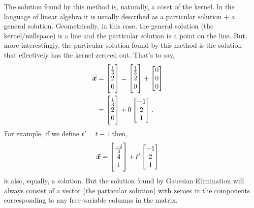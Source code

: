 \documentclass[../MathsNotesBase.tex]{subfiles}
\begin{document}
{		
		
		\bigskip
		The solution found by this method is, naturally, a coset of the kernel. In the language of linear algebra it is usually described as a particular solution + a general solution. Geometrically, in this case, the general solution (the kernel/nullspace) is a line and the particular solution is a point on the line. But, more interestingly, the particular solution found by this method is the solution that effectively has the kernel zero-ed out. That's to say,
		\begin{align*}
		\vec{\bm{x}} &= \begin{bmatrix}\frac{1}{3}\\2\\0\end{bmatrix} = \begin{bmatrix}\frac{1}{3}\\2\\0\end{bmatrix} + \begin{bmatrix}0\\0\\0\end{bmatrix} \\
		&= \begin{bmatrix}\frac{1}{3}\\2\\0\end{bmatrix} + 0 \begin{bmatrix}-1\\2\\1\end{bmatrix}.
		\end{align*}
		For example, if we define ${ t' = t - 1 }$ then,
		\[ \vec{\bm{x}} = \begin{bmatrix}\frac{-2}{3}\\4\\1\end{bmatrix} + t' \begin{bmatrix}-1\\2\\1\end{bmatrix}  \]
		is also, equally, a solution. But the solution found by Gaussian Elimination will always consist of a vector (the particular solution) with zeroes in the components corresponding to any free-variable columns in the matrix.
	}
	
\end{document}
